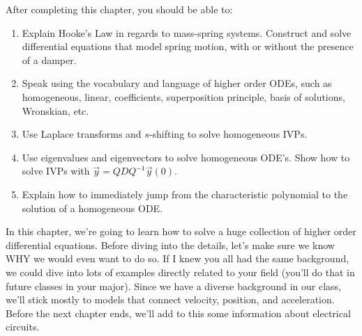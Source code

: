 
After completing this chapter, you should be able to:

\begin{enumerate}
 \item Explain Hooke's Law in regards to mass-spring systems. Construct and solve differential equations that model spring motion, with or without the presence of a damper.  
 \item Speak using the vocabulary and language of higher order ODEs, such as homogeneous, linear, coefficients, superposition principle, basis of solutions, Wronskian, etc. 
 \item Use Laplace transforms and $s$-shifting to solve homogeneous IVPs.
 \item Use eigenvalues and eigenvectors to solve homogeneous ODE's. Show how to solve IVPs with $\vec y = QDQ^{-1}\vec y(0)$. 
 \item Explain how to immediately jump from the characteristic polynomial to the solution of a homogeneous ODE.
\end{enumerate}








\renewcommand{\ideaA}{Building Mathematical Models}
\renewcommand{\ideaB}{Solving Higher Order ODEs}
\renewcommand{\ideaC}{Solving Systems of ODEs with Eigenvalues and Eigenvectors}
\renewcommand{\ideaD}{The theory of homogeneous differential equations}



\mysubsection{\ideaA}

In this chapter, we're going to learn how to solve a huge collection of higher order differential equations.  Before diving into the details, let's make sure we know WHY we would even want to do so. If I knew you all had the same background, we could dive into lots of examples directly related to your field (you'll do that in future classes in your major).  Since we have a diverse background in our class, we'll stick mostly to models that connect velocity, position, and acceleration.  Before the next chapter ends, we'll add to this some information about electrical circuits.


